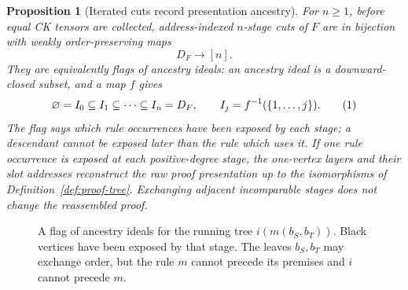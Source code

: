 \documentclass[10pt,a4paper]{article}
\theoremstyle{plain}
\newtheorem{proposition}[theorem]{Proposition}
\theoremstyle{definition}
\theoremstyle{remark}
\newcommand{\eqtag}{\refstepcounter{equation}\tag{\theequation}}
\begin{document}
\begin{proposition}[Iterated cuts record presentation ancestry]
\label{thm:cut-flags}
For \(n\ge1\), before equal CK tensors are collected, address-indexed
\(n\)-stage cuts of \(F\)
are in bijection with weakly order-preserving maps
\[
                         D_F\longrightarrow[n].
\]
They are equivalently flags of ancestry ideals: an ancestry ideal is a
downward-closed subset, and a map \(f\) gives
\[
 \varnothing=I_0\subseteq I_1\subseteq\cdots\subseteq I_n=D_F,
 \qquad I_j=f^{-1}(\{1,\ldots,j\}).
\eqtag\label{eq:ancestry-flag}
\]
The flag says which rule occurrences have been exposed by each stage; a
descendant cannot be exposed later than the rule which uses it.  If one rule
occurrence is exposed at each positive-degree stage, the one-vertex layers and their slot
addresses reconstruct the raw proof presentation up to the
isomorphisms of Definition~\ref{def:proof-tree}.  Exchanging adjacent
incomparable stages does not change the reassembled proof.

\end{proposition}

\begin{figure}[H]
\centering
{}
\caption{A flag of ancestry ideals for the running tree
\(i(m(b_S,b_T))\).  Black vertices have been exposed by that stage.  The
leaves \(b_S,b_T\) may exchange order, but the rule \(m\) cannot precede its
premises and \(i\) cannot precede \(m\).}
\label{fig:iterated-cut-flag}
\end{figure}
\end{document}
